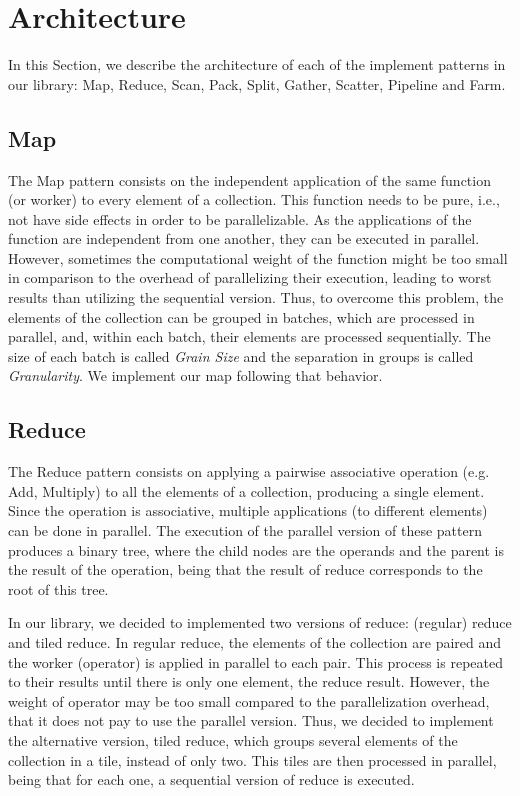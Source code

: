 \documentclass[conference,compsoc]{IEEEtran}
\begin{document}
\section{Architecture} \label{Architecture}

In this Section, we describe the architecture of each of the implement patterns in our library: Map, Reduce, Scan, Pack, Split, Gather, Scatter, Pipeline and Farm.

\subsection{Map}
The Map pattern consists on the independent application of the same function (or worker) to every element of a collection. This function needs to be pure, i.e., not have side effects in order to be parallelizable. As the applications of the function are independent from one another, they can be executed in parallel.
However, sometimes the computational weight of the function might be too small in comparison to the overhead of parallelizing their execution, leading to worst results than utilizing the sequential version. Thus, to overcome this problem, the elements of the collection can be grouped in batches, which are processed in parallel, and, within each batch, their elements are processed sequentially. The size of each batch is called \emph{Grain Size} and the separation in groups is called \emph{Granularity}. We implement our map following that behavior.

\subsection{Reduce}
The Reduce pattern consists on applying a pairwise associative operation (e.g. Add, Multiply) to all the elements of a collection, producing a single element. Since the operation is associative, multiple applications (to different elements) can be done in parallel. The execution of the parallel version of these pattern produces a binary tree, where the child nodes are the operands and the parent is the result of the operation, being that the result of reduce corresponds to the root of this tree.

In our library, we decided to implemented two versions of reduce: (regular) reduce and tiled reduce. In regular reduce, the elements of the collection are paired and the worker (operator) is applied in parallel to each pair. This process is repeated to their results until there is only one element, the reduce result.
However, the weight of operator may be too small compared to the parallelization overhead, that it does not pay to use the parallel version.
Thus, we decided to implement the alternative version, tiled reduce, which groups several elements of the collection in a tile, instead of only two. This tiles are then processed in parallel, being that for each one, a sequential version of reduce is executed.
\end{document}
